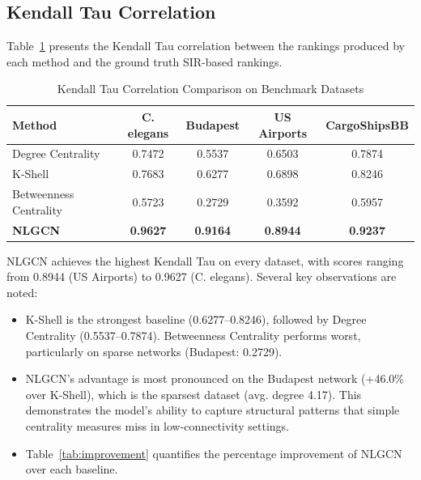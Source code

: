 \subsection{Kendall Tau Correlation}

Table~\ref{tab:kendall} presents the Kendall Tau correlation
 between the rankings produced by each method and the
ground truth SIR-based rankings.

\begin{table}[h]
\centering
\caption{Kendall Tau Correlation Comparison on Benchmark Datasets}
\label{tab:kendall}
\begin{tabular}{|l|c|c|c|c|}
\hline
\textbf{Method} & \textbf{C. elegans} & \textbf{Budapest} &
\textbf{US Airports} & \textbf{CargoShipsBB} \\
\hline
Degree Centrality         & 0.7472 & 0.5537 & 0.6503 & 0.7874 \\
K-Shell                   & 0.7683 & 0.6277 & 0.6898 & 0.8246 \\
Betweenness Centrality    & 0.5723 & 0.2729 & 0.3592 & 0.5957 \\
\textbf{NLGCN} & \textbf{0.9627} & \textbf{0.9164} &
\textbf{0.8944} & \textbf{0.9237} \\
\hline
\end{tabular}
\end{table}

NLGCN achieves the highest Kendall Tau on every dataset, with scores
ranging from 0.8944 (US Airports) to 0.9627 (C. elegans). Several key
observations are noted:

\begin{itemize}
    \item K-Shell is the strongest baseline (0.6277--0.8246), followed
    by Degree Centrality (0.5537--0.7874). Betweenness Centrality
    performs worst, particularly on sparse networks (Budapest: 0.2729).

    \item NLGCN's advantage is most pronounced on the Budapest network
    (+46.0\% over K-Shell), which is the sparsest dataset (avg. degree
    4.17). This demonstrates the model's ability to capture structural
    patterns that simple centrality measures miss in low-connectivity
    settings.

    \item Table~\ref{tab:improvement} quantifies the percentage
    improvement of NLGCN over each baseline.
\end{itemize}

